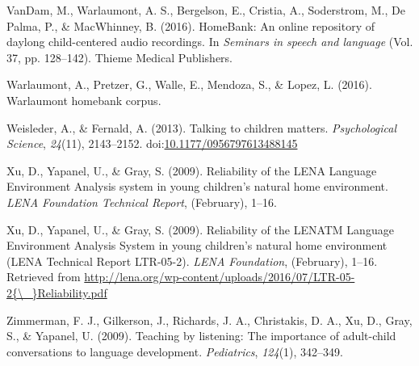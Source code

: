 \documentclass[english,floatsintext,man]{apa6}
\begin{document}
\hypertarget{ref-vandam2016homebank}{}
VanDam, M., Warlaumont, A. S., Bergelson, E., Cristia, A., Soderstrom,
M., De Palma, P., \& MacWhinney, B. (2016). HomeBank: An online
repository of daylong child-centered audio recordings. In \emph{Seminars
in speech and language} (Vol. 37, pp. 128--142). Thieme Medical
Publishers.

\hypertarget{ref-warlaumont2016warlaumont}{}
Warlaumont, A., Pretzer, G., Walle, E., Mendoza, S., \& Lopez, L.
(2016). Warlaumont homebank corpus.

\hypertarget{ref-Weisleder2013a}{}
Weisleder, A., \& Fernald, A. (2013). Talking to children matters.
\emph{Psychological Science}, \emph{24}(11), 2143--2152.
doi:\href{https://doi.org/10.1177/0956797613488145}{10.1177/0956797613488145}

\hypertarget{ref-Xu2009}{}
Xu, D., Yapanel, U., \& Gray, S. (2009). Reliability of the LENA
Language Environment Analysis system in young children's natural home
environment. \emph{LENA Foundation Technical Report}, (February), 1--16.

\hypertarget{ref-Xu2009a}{}
Xu, D., Yapanel, U., \& Gray, S. (2009). Reliability of the LENATM
Language Environment Analysis System in young children's natural home
environment (LENA Technical Report LTR-05-2). \emph{LENA Foundation},
(February), 1--16. Retrieved from
\href{http://lena.org/wp-content/uploads/2016/07/LTR-05-2\%7B/_\%7DReliability.pdf}{http://lena.org/wp-content/uploads/2016/07/LTR-05-2\{\textbackslash{}\_\}Reliability.pdf}

\hypertarget{ref-zimmerman2009}{}
Zimmerman, F. J., Gilkerson, J., Richards, J. A., Christakis, D. A., Xu,
D., Gray, S., \& Yapanel, U. (2009). Teaching by listening: The
importance of adult-child conversations to language development.
\emph{Pediatrics}, \emph{124}(1), 342--349.
\end{document}
